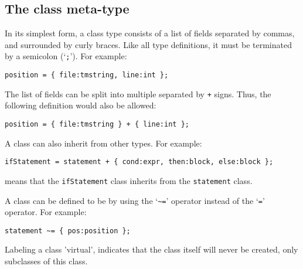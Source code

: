 \subsection{The class meta-type}
In its simplest form, a class type consists of a list of fields separated
by commas, and surrounded by curly braces.  Like all type definitions,
it must be terminated by a semicolon (`\verb';'').  For example:
\begin{showfile}
\begin{verbatim}
position = { file:tmstring, line:int };
\end{verbatim}
\end{showfile}
The list of fields can be split into multiple  separated
by \verb'+' signs. Thus, the following definition would also be allowed:
\begin{showfile}
\begin{verbatim}
position = { file:tmstring } + { line:int };
\end{verbatim}
\end{showfile}
A class can also inherit from other types. 
For example:
\begin{showfile}
\begin{verbatim}
ifStatement = statement + { cond:expr, then:block, else:block };
\end{verbatim}
\end{showfile}
means that the \texttt{ifStatement} class inherits from the \texttt{statement}
class.

A class can be defined to be  by using the `\verb'~=''
operator instead of the `\verb'='' operator. For example:
\begin{showfile}
\begin{verbatim}
statement ~= { pos:position };
\end{verbatim}
\end{showfile}
Labeling a class 'virtual', indicates that the class itself will
never be created, only subclasses of this class.

